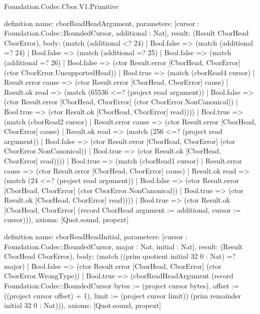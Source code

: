 \begin{lexlean}{Foundation.Codec.Cbor.V1.Primitive}
\begin{semanticmodule}
definition{
  name: cborReadHeadArgument,
  parameters: [cursor : Foundation.Codec::BoundedCursor, additional : Nat],
  result: (Result CborHead CborError),
  body: (match (additional <? 24)
    | Bool.false => (match (additional =? 24)
      | Bool.false => (match (additional =? 25)
        | Bool.false => (match (additional =? 26)
          | Bool.false => (ctor Result.error [CborHead, CborError] (ctor CborError.UnsupportedHead))
          | Bool.true => (match (cborRead4 cursor)
            | Result.error cause => (ctor Result.error [CborHead, CborError] cause)
            | Result.ok read => (match (65536 <=? (project read argument))
              | Bool.false => (ctor Result.error [CborHead, CborError] (ctor CborError.NonCanonical))
              | Bool.true => (ctor Result.ok [CborHead, CborError] read))))
        | Bool.true => (match (cborRead2 cursor)
          | Result.error cause => (ctor Result.error [CborHead, CborError] cause)
          | Result.ok read => (match (256 <=? (project read argument))
            | Bool.false => (ctor Result.error [CborHead, CborError] (ctor CborError.NonCanonical))
            | Bool.true => (ctor Result.ok [CborHead, CborError] read))))
      | Bool.true => (match (cborRead1 cursor)
        | Result.error cause => (ctor Result.error [CborHead, CborError] cause)
        | Result.ok read => (match (24 <=? (project read argument))
          | Bool.false => (ctor Result.error [CborHead, CborError] (ctor CborError.NonCanonical))
          | Bool.true => (ctor Result.ok [CborHead, CborError] read))))
    | Bool.true => (ctor Result.ok [CborHead, CborError] (record CborHead {argument := additional, cursor := cursor}))),
  axioms: [Quot.sound, propext]
}

definition{
  name: cborReadHeadInitial,
  parameters: [cursor : Foundation.Codec::BoundedCursor, major : Nat, initial : Nat],
  result: (Result CborHead CborError),
  body: (match ((prim quotient initial 32 0 : Nat) =? major)
    | Bool.false => (ctor Result.error [CborHead, CborError] (ctor CborError.WrongType))
    | Bool.true => (cborReadHeadArgument (record Foundation.Codec::BoundedCursor {bytes := (project cursor bytes), offset := ((project cursor offset) + 1), limit := (project cursor limit)}) (prim remainder initial 32 0 : Nat))),
  axioms: [Quot.sound, propext]
}


\end{semanticmodule}
\end{lexlean}
